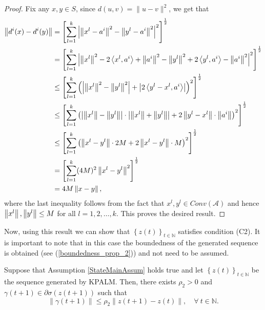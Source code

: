 \begin{proof}
Fix any $x,y \in S$, since $d(u,v) = \| u-v \|^2$, we get that
\begin{align*} 
	\left\Vert {d^i(x)  - d^i(y)} \right\Vert 
	&= \left[ \sum\limits_{l=1}^{k} \left\lvert \left\Vert {x^l - a^i} \right\Vert^2 - \left\Vert { y^l -a^i} \right\Vert^2 \right\rvert^2 \right]^{\frac{1}{2}} \\
	&= \left[ \sum\limits_{l=1}^{k} \left\lvert \left\Vert {x^l} \right\Vert^2 - 2\left\langle x^l,a^i \right\rangle + \left\Vert {a^i} \right\Vert^2 - \left\Vert {y^l} \right\Vert^2 + 2\left\langle y^l,a^i \right\rangle - \left\Vert {a^i} \right\Vert^2 \right\rvert ^2 \right]^{\frac{1}{2}} \\ 
	&\leq \left[ \sum\limits_{l=1}^{k} \left( \left\lvert \left\Vert {x^l} \right\Vert^2 - \left\Vert {y^l} \right\Vert^2 \right\rvert + \left\lvert 2\left\langle y^l - x^l , a^i \right\rangle \right\rvert \right)^2 \right]^{\frac{1}{2}} \\ 
	&\leq \left[ \sum\limits_{l=1}^{k} \left( \left\lvert \left\Vert {x^l} \right\Vert - \left\Vert {y^l} \right\Vert \right\rvert \cdot \left\lvert \left\Vert {x^l} \right\Vert + \left\Vert {y^l} \right\Vert \right\rvert + 2 \left\Vert {y^l - x^l} \right\Vert \cdot \left\Vert {a^i} \right\Vert \right)^2 \right]^{\frac{1}{2}} \\
	&\leq \left[ \sum\limits_{l=1}^{k} \left( \left\Vert {x^l - y^l} \right\Vert \cdot 2M + 2 \left\Vert {x^l - y^l} \right\Vert\cdot M \right)^2 \right]^{\frac{1}{2}} \\
	&= \left[ \sum\limits_{l=1}^{k} (4M)^2 \left\Vert {x^l - y^l} \right\Vert^2 \right]^{\frac{1}{2}} \\
	&= 4M \left\Vert {x - y} \right\Vert ,
\end{align*}
where the last inequality follows from the fact that $x^l,y^l \in Conv(\mathcal{A})$ and hence $\left\Vert {x^l} \right\Vert,\left\Vert {y^l} \right\Vert \leq M$ for all $l=1,2,\ldots,k$. This proves the desired result.
\end{proof}

Now, using this result we can show that $\left\lbrace z(t) \right\rbrace_{t \in \mathbb{N}}$ satisfies condition (C2). It is important to note that in this case the boundedness of the generated sequence is obtained (see (\ref{boundedness_prop_2})) and not need to be assumed.

\begin{proposition} \label{State_KPALM_SGP}
Suppose that Assumption \ref{StateMainAssum} holds true and let $\left\lbrace z(t) \right\rbrace_{t \in \mathbb{N}}$ be the sequence generated by KPALM. Then, there exists $\rho_2 > 0$ and $\gamma(t+1) \in \partial \sigma(z(t+1))$ such that 
\begin{equation*}
	\| \gamma(t+1)\| \leq \rho_2 \|z(t+1) - z(t)\|, \quad \forall \: t \in \mathbb{N} .
\end{equation*}

\end{proposition}

